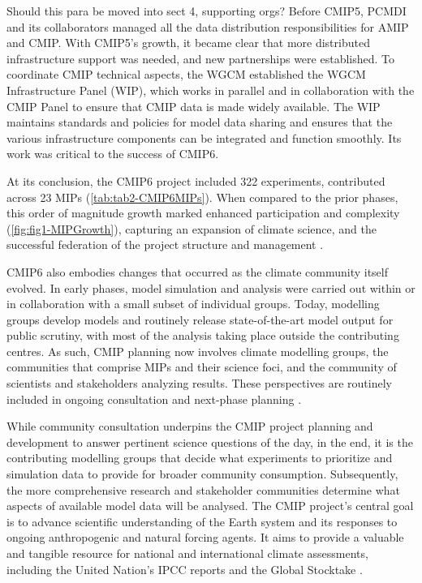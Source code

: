 \documentclass[gmd, preprint]{copernicus}
\def\cred#1{{\color{red}#1}}
\begin{document}
\cred{Should this para be moved into sect 4, supporting orgs?} Before CMIP5, PCMDI and its collaborators managed all the data distribution responsibilities for AMIP and CMIP. With CMIP5's growth, it became clear that more distributed infrastructure support was needed, and new partnerships were established. To coordinate CMIP technical aspects, the WGCM established the WGCM Infrastructure Panel (WIP), which works in parallel and in collaboration with the CMIP Panel to ensure that CMIP data is made widely available. The WIP maintains standards and policies for model data sharing and ensures that the various infrastructure components can be integrated and function smoothly. Its work was critical to the success of CMIP6. 

At its conclusion, the CMIP6 project included 322 experiments, contributed across 23 MIPs (\autoref{tab:tab2-CMIP6MIPs}). When compared to the prior phases, this order of magnitude growth marked enhanced participation and complexity (\autoref{fig:fig1-MIPGrowth}), capturing an expansion of climate science, and the successful federation of the project structure and management \citep{eyring_overview_2016}.

CMIP6 also embodies changes that occurred as the climate community itself evolved. In early phases, model simulation and analysis were carried out within or in collaboration with a small subset of individual groups. Today, modelling groups develop models and routinely release state-of-the-art model output for public scrutiny, with most of the analysis taking place outside the contributing centres. As such, CMIP planning now involves climate modelling groups, the communities that comprise MIPs and their science foci, and the community of scientists and stakeholders analyzing results. These perspectives are routinely included in ongoing consultation and next-phase planning \citep{stouffer_cmip5_2017}.

While community consultation underpins the CMIP project planning and development to answer pertinent science questions of the day, in the end, it is the contributing modelling groups that decide what experiments to prioritize and simulation data to provide for broader community consumption. Subsequently, the more comprehensive research and stakeholder communities determine what aspects of available model data will be analysed. The CMIP project's central goal is to advance scientific understanding of the Earth system and its responses to ongoing anthropogenic and natural forcing agents. It aims to provide a valuable and tangible resource for national and international climate assessments, including the United Nation's IPCC reports and the Global Stocktake \citep{stouffer_cmip5_2017}.
\end{document}
